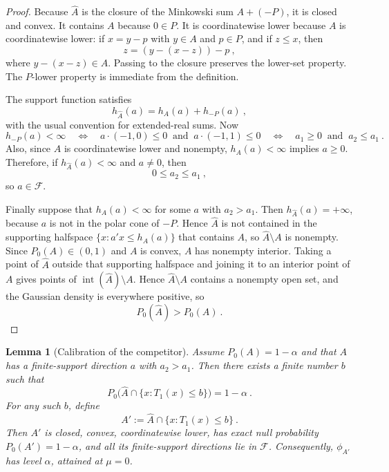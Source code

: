 \documentclass[12pt]{article}
\newtheorem{lemma}{Lemma}
\theoremstyle{remark}
\begin{document}
\begin{proof}
Because $\widehat A$ is the closure of the Minkowski sum $A+(-P)$, it is closed and convex.  It contains $A$ because $0\in P$.  It is coordinatewise lower because $A$ is coordinatewise lower: if $x=y-p$ with $y\in A$ and $p\in P$, and if $z\le x$, then
\[
z=(y-(x-z))-p~,
\]
where $y-(x-z)\in A$.  Passing to the closure preserves the lower-set property.  The $P$-lower property is immediate from the definition.

The support function satisfies
\[
h_{\widehat A}(a)=h_A(a)+h_{-P}(a)~,
\]
with the usual convention for extended-real sums.  Now
\[
h_{-P}(a)<\infty
\quad\Longleftrightarrow\quad
 a\cdot(-1,0)\le0\ \text{ and }\ a\cdot(-1,1)\le0
\quad\Longleftrightarrow\quad
 a_1\ge0\ \text{ and }\ a_2\le a_1~.
\]
Also, since $A$ is coordinatewise lower and nonempty, $h_A(a)<\infty$ implies $a\ge0$.  Therefore, if $h_{\widehat A}(a)<\infty$ and $a\ne0$, then
\[
0\le a_2\le a_1~,
\]
so $a\in\mathcal F$.

Finally suppose that $h_A(a)<\infty$ for some $a$ with $a_2>a_1$.  Then $h_{\widehat A}(a)=+\infty$, because $a$ is not in the polar cone of $-P$.  Hence $\widehat A$ is not contained in the supporting halfspace $\{x:a'x\le h_A(a)\}$ that contains $A$, so $\widehat A\setminus A$ is nonempty.  Since $P_0(A)\in(0,1)$ and $A$ is convex, $A$ has nonempty interior.  Taking a point of $\widehat A$ outside that supporting halfspace and joining it to an interior point of $A$ gives points of $\operatorname{int}(\widehat A)\setminus A$.  Hence $\widehat A\setminus A$ contains a nonempty open set, and the Gaussian density is everywhere positive, so
\[
P_0(\widehat A)>P_0(A)~.
\]
\end{proof}

\begin{lemma}[Calibration of the competitor]\label{lem:competitor}
Assume $P_0(A)=1-\alpha$ and that $A$ has a finite-support direction $a$ with $a_2>a_1$.  Then there exists a finite number $b$ such that
\[
P_0\big(\widehat A\cap\{x:T_1(x)\le b\}\big)=1-\alpha~.
\]
For any such $b$, define
\[
A':=\widehat A\cap\{x:T_1(x)\le b\}~.
\]
Then $A'$ is closed, convex, coordinatewise lower, has exact null probability $P_0(A')=1-\alpha$, and all its finite-support directions lie in $\mathcal F$.  Consequently, $\phi_{A'}$ has level $\alpha$, attained at $\mu=0$.
\end{lemma}
\end{document}
